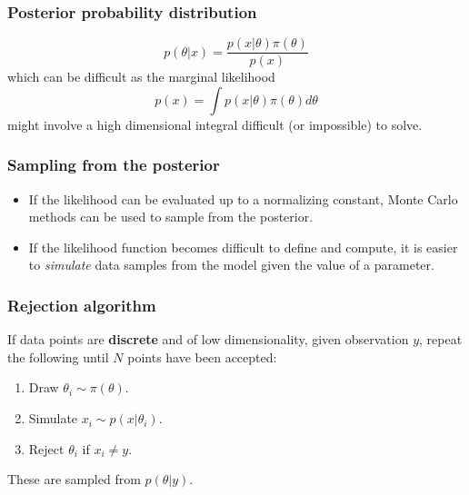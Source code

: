 \documentclass{beamer}
\newcommand{\1}{\ensuremath{\mathbf{1}}}
\begin{document}
%
%
%
\begin{frame}\frametitle{Posterior probability distribution}
	\begin{equation}
		p(\theta|x) = \frac{p(x|\theta)\pi(\theta)}{p(x)}
	\end{equation}
	which can be difficult as the marginal likelihood
	\begin{equation}
		p(x) = \int p(x|\theta)\pi(\theta)d\theta
	\end{equation}
	might involve a high dimensional integral difficult (or impossible) to solve.
\end{frame}
%
%
%
\begin{frame}\frametitle{Sampling from the posterior}
	\begin{itemize}
		\item If the likelihood can be evaluated up to a normalizing constant, Monte Carlo methods can be used to sample from the posterior.
		\item If the likelihood function becomes difficult to define and compute, it is easier to \emph{simulate} data samples from the model given the value of a parameter.
	\end{itemize}
\end{frame}
%
%
%
\begin{frame}\frametitle{Rejection algorithm}
	If data points are \textbf{discrete} and of low dimensionality, given observation $y$, repeat the following until $N$ points have been accepted:
	\begin{enumerate}
		\item Draw $\theta_i \sim \pi(\theta)$.
		\item Simulate $x_i \sim p(x|\theta_i)$.
		\item Reject $\theta_i$ if $x_i \neq y$.
	\end{enumerate}
	These are sampled from $p(\theta|y)$.
\end{frame}
%
%
%
\end{document}
